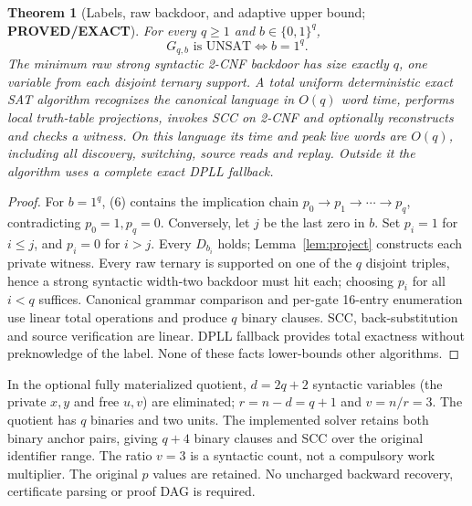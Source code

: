 \documentclass[11pt]{article}
\newtheorem{theorem}{Theorem}
\newcommand{\PROVED}{\textbf{PROVED/EXACT}}
\begin{document}
\begin{theorem}[Labels, raw backdoor, and adaptive upper bound;
\PROVED]\label{th:family}
For every $q\ge1$ and $b\in\{0,1\}^q$,
\[
G_{q,b}\text{ is UNSAT}\iff b=1^q.
\tag{8}
\]
The minimum raw strong syntactic 2-CNF backdoor has size exactly
$q$, one variable from each disjoint ternary support. A
total uniform deterministic exact SAT algorithm recognizes the
canonical language in $O(q)$ word time, performs local truth-table
projections, invokes SCC on 2-CNF and optionally reconstructs and
checks a witness. On this language its time and peak live words are
$O(q)$, including all discovery, switching, source reads and replay.
Outside it the algorithm uses a complete exact DPLL fallback.
\end{theorem}
\begin{proof}
For $b=1^q$, (6) contains the implication chain
$p_0\to p_1\to\cdots\to p_q$, contradicting
$p_0=1,p_q=0$. Conversely, let $j$ be the last zero
in $b$. Set $p_i=1$ for $i\le j$, and $p_i=0$
for $i>j$. Every $D_{b_i}$ holds; Lemma~\ref{lem:project}
constructs each private witness.
Every raw ternary is supported on one of the $q$ disjoint
triples, hence a strong syntactic width-two backdoor must
hit each; choosing $p_i$ for all $i<q$ suffices.
Canonical grammar comparison and per-gate 16-entry enumeration
use linear total operations and produce $q$ binary clauses.
SCC, back-substitution and source verification are linear.
DPLL fallback provides total exactness without preknowledge of
the label. None of these facts lower-bounds other algorithms.
\end{proof}

In the optional fully materialized quotient,
$d=2q+2$ syntactic variables (the private $x,y$ and
free $u,v$) are eliminated; $r=n-d=q+1$ and
$v=n/r=3$. The quotient has $q$ binaries and two units.
The implemented solver retains both binary anchor pairs,
giving $q+4$ binary clauses and SCC over the original
identifier range. The ratio $v=3$ is a syntactic count,
not a compulsory work multiplier.
The original $p$ values are retained. No uncharged
backward recovery, certificate parsing or proof DAG is required.
\end{document}

